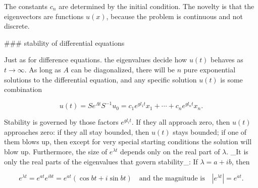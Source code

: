 The constants \(c_{n}\) are determined by the initial condition. The novelty is that the eigenvectors are functions \(u(x)\), because the problem is continuous and not discrete.

### stability of differential equations

Just as for difference equations. the eigenvalues decide how \(u(t)\) behaves as \(t\to\infty\). As long as \(A\) can be diagonalized, there will be \(n\) pure exponential solutions to the differential equation, and any specific solution \(u(t)\) is some combination

\[u(t)=Se^{\Lambda t}S^{-1}u_{0}=c_{1}e^{gl_{1}t}x_{1}+\cdots+c_{n}e^{gl_{n}t}x_ {n}.\]

Stability is governed by those factors \(e^{gl_{i}t}\). If they all approach zero, then \(u(t)\) approaches zero: if they all stay bounded, then \(u(t)\) stays bounded; if one of them blows up, then except for very special starting conditions the solution will blow up. Furthermore, the size of \(e^{\lambda t}\) depends only on the real part of \(\lambda\). _It is only the real parts of the eigenvalues that govern stability_: If \(\lambda=a+ib\), then

\[e^{\lambda t}=e^{at}e^{ibt}=e^{at}(\cos bt+i\sin bt)\quad\text{and the magnitude is}\quad|e^{\lambda t}|=e^{at}.\] 
